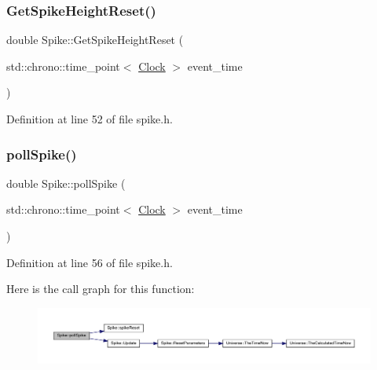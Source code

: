 \subsubsection{\texorpdfstring{Get\+Spike\+Height\+Reset()}{GetSpikeHeightReset()}}
{\footnotesize\ttfamily double Spike\+::\+Get\+Spike\+Height\+Reset (\begin{DoxyParamCaption}\item[{std\+::chrono\+::time\+\_\+point$<$ \hyperlink{universe_8h_a0ef8d951d1ca5ab3cfaf7ab4c7a6fd80}{Clock} $>$}]{event\+\_\+time }\end{DoxyParamCaption})\hspace{0.3cm}{\ttfamily [inline]}}



Definition at line 52 of file spike.\+h.

\mbox{\label{class_spike_ac465dbe6500f1eb1f5421f7174f91dd3}} 
\subsubsection{\texorpdfstring{poll\+Spike()}{pollSpike()}}
{\footnotesize\ttfamily double Spike\+::poll\+Spike (\begin{DoxyParamCaption}\item[{std\+::chrono\+::time\+\_\+point$<$ \hyperlink{universe_8h_a0ef8d951d1ca5ab3cfaf7ab4c7a6fd80}{Clock} $>$}]{event\+\_\+time }\end{DoxyParamCaption})\hspace{0.3cm}{\ttfamily [inline]}}



Definition at line 56 of file spike.\+h.

Here is the call graph for this function\+:
\nopagebreak
\begin{figure}[H]
\begin{center}
\leavevmode
\includegraphics[width=350pt]{class_spike_ac465dbe6500f1eb1f5421f7174f91dd3_cgraph}
\end{center}
\end{figure}
\mbox{\label{class_spike_af4475560da7a33e70a0f2036197f000f}} 
